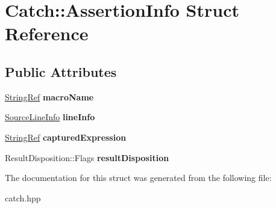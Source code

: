 \hypertarget{structCatch_1_1AssertionInfo}{}\section{Catch\+::Assertion\+Info Struct Reference}
\label{structCatch_1_1AssertionInfo}
\subsection*{Public Attributes}
\begin{DoxyCompactItemize}
\item 
\mbox{\label{structCatch_1_1AssertionInfo_aaf3fbb9f1fe09c879ba3d877584e3056}} 
\mbox{\hyperlink{classCatch_1_1StringRef}{String\+Ref}} {\bfseries macro\+Name}
\item 
\mbox{\label{structCatch_1_1AssertionInfo_a17bdbb404ba12658034f833be2f4c3e7}} 
\mbox{\hyperlink{structCatch_1_1SourceLineInfo}{Source\+Line\+Info}} {\bfseries line\+Info}
\item 
\mbox{\label{structCatch_1_1AssertionInfo_accd36744b4acaa3a691a72df0b42190f}} 
\mbox{\hyperlink{classCatch_1_1StringRef}{String\+Ref}} {\bfseries captured\+Expression}
\item 
\mbox{\label{structCatch_1_1AssertionInfo_a60353b3632ab2f827162f2b2d6911073}} 
Result\+Disposition\+::\+Flags {\bfseries result\+Disposition}
\end{DoxyCompactItemize}


The documentation for this struct was generated from the following file\+:\begin{DoxyCompactItemize}
\item 
catch.\+hpp\end{DoxyCompactItemize}
